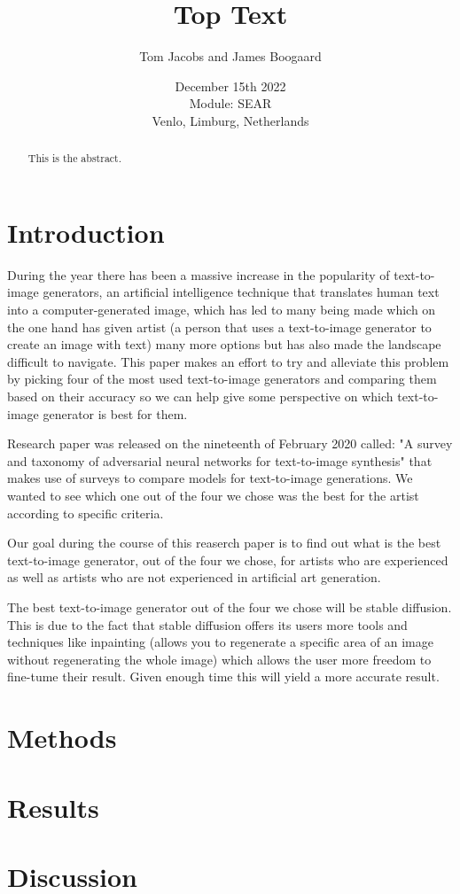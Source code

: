\documentclass[]{report}
\title{Top Text}
\author{Tom Jacobs and James Boogaard}
\date{December 15th 2022 \\Module: SEAR \\Venlo, Limburg, Netherlands}
\begin{document}
	
	\maketitle
	
	\begin{abstract}
		This is the abstract.
		
		
	\end{abstract}
	
	\tableofcontents
	\setcounter{page}{3}
	\listoffigures %
	\pagebreak
	
	
	\section{Introduction}
	During the year there has been a massive increase in the popularity of text-to-image generators, an artificial intelligence technique that translates human text into a computer-generated image, which has led to many being made which on the one hand has given artist (a person that uses a text-to-image generator to create an image with text) many more options but has also made the landscape difficult to navigate. This paper makes an effort to try and alleviate this problem by picking four of the most used text-to-image generators and comparing them based on their accuracy so we can help give some perspective on which text-to-image generator is best for them.
	
	Research paper was released on the nineteenth of February 2020 called: "A survey and taxonomy of adversarial neural networks for text-to-image synthesis" that makes use of surveys to compare models for text-to-image generations. We wanted to see which one out of the four we chose was the best for the artist according to specific criteria.
	
	Our goal during the course of this reaserch paper is to find out what is the best text-to-image generator, out of the four we chose, for artists who are experienced as well as artists who are not experienced in artificial art generation.
	
	The best text-to-image generator out of the four we chose will be stable diffusion. This is due to the fact that stable diffusion offers its users more tools and techniques like inpainting (allows you to regenerate a specific area of an image without regenerating the whole image) which allows the user more freedom to fine-tume their result. Given enough time this will yield a more accurate result. 
	
	
	\section{Methods}
	\lipsum
	\section{Results}
	\newpage	
	\section{Discussion}
	
\end{document}

